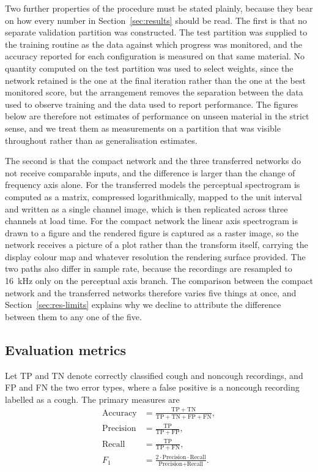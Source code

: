 \documentclass[pdflatex,sn-mathphys-num]{sn-jnl}
\begin{document}
Two further properties of the procedure must be stated plainly, because they
bear on how every number in Section~\ref{sec:results} should be read. The
first is that no separate validation partition was constructed. The test
partition was supplied to the training routine as the data against which
progress was monitored, and the accuracy reported for each configuration is
measured on that same material. No quantity computed on the test partition
was used to select weights, since the network retained is the one at the final
iteration rather than the one at the best monitored score, but the
arrangement removes the separation between the data used to observe training
and the data used to report performance. The figures below are therefore not
estimates of performance on unseen material in the strict sense, and we treat
them as measurements on a partition that was visible throughout rather than as
generalisation estimates.

The second is that the compact network and the three transferred networks do
not receive comparable inputs, and the difference is larger than the change of
frequency axis alone. For the transferred models the perceptual spectrogram is
computed as a matrix, compressed logarithmically, mapped to the unit interval
and written as a single channel image, which is then replicated across three
channels at load time. For the compact network the linear axis spectrogram is
drawn to a figure and the rendered figure is captured as a raster image, so
the network receives a picture of a plot rather than the transform itself,
carrying the display colour map and whatever resolution the rendering surface
provided. The two paths also differ in sample rate, because the recordings are
resampled to 16~kHz only on the perceptual axis branch. The comparison between
the compact network and the transferred networks therefore varies five things
at once, and Section~\ref{sec:res-limits} explains why we decline to attribute
the difference between them to any one of the five.

\subsection{Evaluation metrics}\label{sec:s-metrics}

Let TP and TN denote correctly classified cough and noncough recordings, and
FP and FN the two error types, where a false positive is a noncough recording
labelled as a cough. The primary measures are
\begin{align}
\text{Accuracy} &= \frac{\mathrm{TP} + \mathrm{TN}}
{\mathrm{TP} + \mathrm{TN} + \mathrm{FP} + \mathrm{FN}}, \label{eq:acc} \\[4pt]
\text{Precision} &= \frac{\mathrm{TP}}{\mathrm{TP} + \mathrm{FP}},
\label{eq:prec} \\[4pt]
\text{Recall} &= \frac{\mathrm{TP}}{\mathrm{TP} + \mathrm{FN}},
\label{eq:rec} \\[4pt]
F_1 &= \frac{2 \cdot \text{Precision} \cdot \text{Recall}}
{\text{Precision} + \text{Recall}}. \label{eq:f1}
\end{align}
\end{document}
